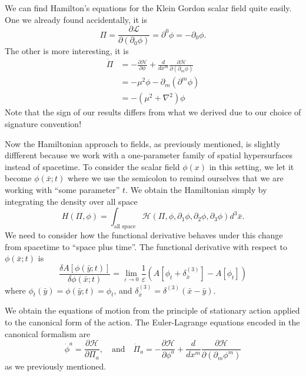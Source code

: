 \begin{ex}
\begin{footnotesize}
We can find Hamilton's equations for the Klein Gordon scalar
field quite easily. One we already found accidentally, it is
\begin{equation}%
\Pi = \frac{\partial\mathcal{L}}{\partial(\partial_{0}\phi)} =
\partial^{0}\phi = -\partial_{0}\phi.
\end{equation}
The other is more interesting, it is
\begin{subequations}
\begin{align}
\dot{\Pi} &= -\frac{\partial\mathcal{H}}{\partial\phi}+\frac{d}{dx^{m}}\frac{\partial\mathcal{H}}{\partial(\partial_{m}\phi)}\\
&= -\mu^{2}\phi - \partial_{m}(\partial^{m}\phi)\\
&= -(\mu^{2}+\nabla^{2})\phi
\end{align}
\end{subequations}
Note that the sign of our results differs from what we derived
due to our choice of signature convention!
\end{footnotesize}\end{ex}

Now the Hamiltonian approach to fields, as previously mentioned,
is slightly diffferent because we work with a one-parameter
family of spatial hypersurfaces instead of spacetime. To consider
the scalar field $\phi(x)$ in this setting, we let it become
$\phi(\bar{x};t)$ where we use the semicolon to remind ourselves
that we are working with ``some parameter'' $t$. We obtain the
Hamiltonian simply by integrating the density over all space
\begin{equation}%
H(\Pi,\phi) = \int_{\text{all space}}\mathcal{H}(\Pi,\phi,\partial_{1}\phi,\partial_{2}\phi,\partial_{3}\phi)d^{3}\bar{x}.
\end{equation}
We need to consider how the functional derivative behaves under
this change from spacetime to ``space plus time''. The functional
derivative with respect to $\phi(\bar{x};t)$ is
\begin{equation}%
\frac{\delta A[\phi(\bar{y};t)]}{\delta\phi(\bar{x};t)} = \lim_{\varepsilon\to0}\frac{1}{\varepsilon}\left(A[\phi_{t}+\delta^{(3)}_{\bar{x}}]-A[\phi_{t}]\right)
\end{equation}
where $\phi_{t}(\bar{y})=\phi(\bar{y};t)=\phi_{t}$, and $\delta^{(3)}_{\bar{x}}=\delta^{(3)}(\bar{x}-\bar{y})$.

We obtain the equations of motion from the principle of
stationary action applied to the canonical form of the
action. The Euler-Lagrange equations encoded in the canonical
formalism are
\begin{equation}%
\dot{\phi}^{a} =
\frac{\partial\mathcal{H}}{\partial\Pi_{a}},\quad\text{and}\quad\dot{\Pi}_{a}
= -\frac{\partial\mathcal{H}}{\partial\phi^{a}}+\frac{d}{dx^{m}}\frac{\partial\mathcal{H}}{\partial(\partial_{m}\phi^{m})}
\end{equation}
as we previously mentioned.

